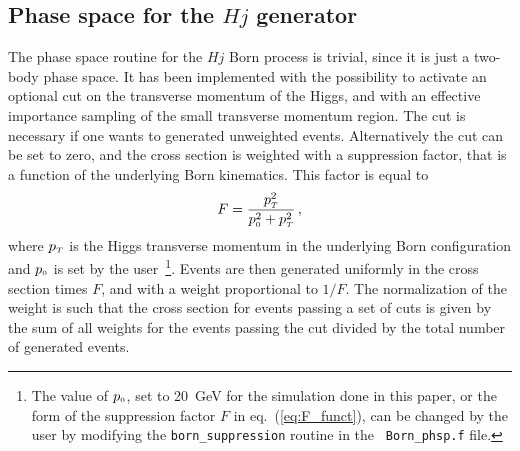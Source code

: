 \documentclass[paper]{JHEP3}
\newcommand\sss{\mathchoice%
{\displaystyle}%
{\scriptstyle}%
{\scriptscriptstyle}%
{\scriptscriptstyle}%
}
\newcommand\pt{p_{\sss T}}
\newcommand\pzero{p_{\sss\rm 0}}
\begin{document}
\subsection{Phase space for the $Hj$ generator}
The phase space routine for the $Hj$ Born process is trivial, since it is
just a two-body phase space. It has been implemented with the possibility
to activate an optional cut on the transverse momentum of the Higgs, and
with an effective importance sampling of the small transverse momentum region.
The cut is necessary if one wants to generated unweighted events. Alternatively
the cut can be set to zero, and the cross section is weighted with a suppression
factor,  that is a function of the underlying Born kinematics. This factor is equal to
\begin{equation}
\label{eq:F_funct}
F=\frac{\pt^2}{\pzero^2+\pt^2}\,,
\end{equation}
where $\pt$ is the Higgs transverse momentum in the underlying Born
configuration and $\pzero$ is set by the user~\footnote{The value of
  $\pzero$, set to 20~GeV for the simulation done in this paper, or the form
  of the suppression factor $F$ in eq.~(\ref{eq:F_funct}), can be changed by
  the user by modifying the {\tt born\_suppression} routine in the {\tt
    Born\_phsp.f} file.}. Events are then generated uniformly in the cross
section times $F$, and with a weight proportional to $1/F$. The normalization
of the weight is such that the cross section for events passing a set of cuts
is given by the sum of all weights for the events passing the cut divided by
the total number of generated events.
\end{document}
